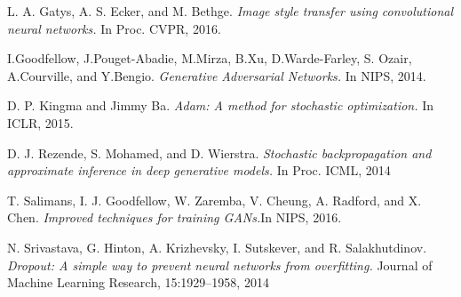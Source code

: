 \documentclass[12pt,a4paper]{report}
\begin{document}
\renewcommand\bibname{Bibliography} %







\tableofcontents
\listoffigures

\newpage
{} %

    
    
    
    
    


\begin{thebibliography}{9}
L. A. Gatys, A. S. Ecker, and M. Bethge.
\textit{ Image style transfer using convolutional neural networks.}
In Proc. CVPR, 2016.
 
I.Goodfellow, J.Pouget-Abadie, M.Mirza, B.Xu, D.Warde-Farley, S. Ozair, A.Courville, and Y.Bengio. 
\textit{ Generative Adversarial Networks.} In NIPS, 2014.
 
D. P. Kingma and Jimmy Ba.
\textit{ Adam: A method for stochastic optimization.}  In ICLR, 2015.

D. J. Rezende, S. Mohamed, and D. Wierstra.
\textit{  Stochastic backpropagation and approximate inference in deep generative models.} In Proc. ICML, 2014

T. Salimans, I. J. Goodfellow, W. Zaremba, V. Cheung, A. Radford, and X. Chen.
\textit{  Improved techniques for training GANs.}In NIPS, 2016.

N. Srivastava, G. Hinton, A. Krizhevsky, I. Sutskever, and R. Salakhutdinov.
\textit{  Dropout: A simple way to prevent neural networks from overfitting.}  Journal of Machine Learning Research, 15:1929–1958, 2014



\end{thebibliography}
\end{document}
